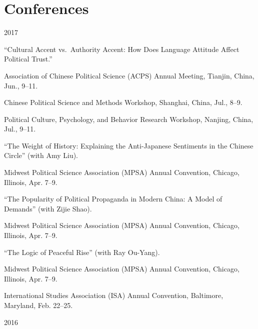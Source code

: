 \documentclass[10.5pt,]{article}
\providecommand{\tightlist}{%
	\setlength{\itemsep}{0pt}\setlength{\parskip}{0pt}}
\renewenvironment{itemize}{
	\begin{list}{}{
			\setlength{\leftmargin}{1.5em}
		}
	}{
	\end{list}
}
\begin{document}
\section{Conferences}\label{conferences}

\begin{itemize}
\tightlist
\item
  2017

  \begin{itemize}
  \tightlist
  \item
    ``Cultural Accent vs.~Authority Accent: How Does Language Attitude
    Affect Political Trust.''

    \begin{itemize}
    \tightlist
    \item
      \footnotesize Association of Chinese Political Science (ACPS)
      Annual Meeting, Tianjin, China, Jun., 9--11.
    \item
      \footnotesize Chinese Political Science and Methods Workshop,
      Shanghai, China, Jul., 8--9.
    \item
      \footnotesize Political Culture, Psychology, and Behavior Research
      Workshop, Nanjing, China, Jul., 9--11.
    \end{itemize}
  \item
    ``The Weight of History: Explaining the Anti-Japanese Sentiments in
    the Chinese Circle'' (with Amy Liu).

    \begin{itemize}
    \tightlist
    \item
      \footnotesize Midwest Political Science Association (MPSA) Annual
      Convention, Chicago, Illinois, Apr. 7--9.
    \end{itemize}
  \item
    ``The Popularity of Political Propaganda in Modern China: A Model of
    Demands'' (with Zijie Shao).

    \begin{itemize}
    \tightlist
    \item
      \footnotesize Midwest Political Science Association (MPSA) Annual
      Convention, Chicago, Illinois, Apr. 7--9.
    \end{itemize}
  \item
    ``The Logic of Peaceful Rise'' (with Ray Ou-Yang).

    \begin{itemize}
    \tightlist
    \item
      \footnotesize Midwest Political Science Association (MPSA) Annual
      Convention, Chicago, Illinois, Apr. 7--9.
    \item
      \footnotesize International Studies Association (ISA) Annual
      Convention, Baltimore, Maryland, Feb. 22--25.
    \end{itemize}
  \end{itemize}
\item
  2016


\end{itemize}
\end{document}
